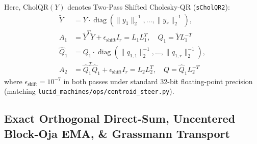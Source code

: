 \documentclass[10pt,twocolumn,letterpaper]{article}
\begin{document}
Here, $\text{CholQR}(Y)$ denotes Two-Pass Shifted Cholesky-QR (\texttt{sCholQR2}):
\begin{align}
    \tilde{Y} &= Y \cdot \operatorname{diag}(\|y_1\|_2^{-1}, \dots, \|y_r\|_2^{-1}), \nonumber \\
    A_1 &= \tilde{Y}^T \tilde{Y} + \epsilon_{\text{shift}} I_r = L_1 L_1^T, \quad Q_1 = \tilde{Y} L_1^{-T} \\
    \hat{Q}_1 &= Q_1 \cdot \operatorname{diag}(\|q_{1,1}\|_2^{-1}, \dots, \|q_{1,r}\|_2^{-1}), \nonumber \\
    A_2 &= \hat{Q}_1^T \hat{Q}_1 + \epsilon_{\text{shift}} I_r = L_2 L_2^T, \quad Q = \hat{Q}_1 L_2^{-T}
\end{align}
where $\epsilon_{\text{shift}} = 10^{-7}$ in both passes under standard 32-bit floating-point precision (matching \texttt{lucid\_machines/ops/centroid\_steer.py}).

\subsection{Exact Orthogonal Direct-Sum, Uncentered Block-Oja EMA, \& Grassmann Transport}
\end{document}
